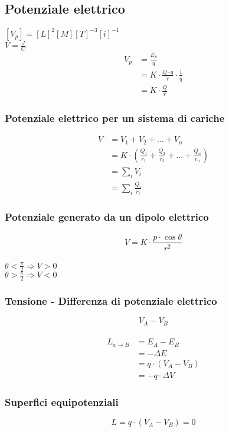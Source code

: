\documentclass[a4paper,12pt]{article}
\theoremstyle{mystyle}
\begin{document}
\newpage


\subsection{Potenziale elettrico}
\([V_p]=[L]^2[M][T]^{-3}[i]^{-1}\)\\
\(V= \frac{J}{C}\)\\
\[\begin{aligned}
    V_p &= \frac{E_p}{q} \\
    &= K \cdot \frac{Q \cdot q}{r} \cdot \frac{1}{q}\\
    &= K \cdot \frac{Q}{r}
\end{aligned}\]
\subsubsection{Potenziale elettrico per un sistema di cariche}
\[
\begin{aligned}
    V & = V_1 + V_2 + \ldots + V_n\\
    &= K \cdot \left( \frac{Q_1}{r_1} + \frac{Q_2}{r_2} + \ldots + \frac{Q_n}{r_n}\right ) \\
    &= \sum_i V_i\\
    &= \sum_i \frac{Q_i}{r_i}
\end{aligned}\]
\subsubsection{Potenziale generato da un dipolo elettrico}
\[V = K \cdot \frac{p \cdot \cos \theta}{r^2}\]\\
\(\theta < \frac{\pi}{2} \Rightarrow V >0\)\\
\(\theta > \frac{\pi}{2} \Rightarrow V < 0\)
\subsubsection{Tensione - Differenza di potenziale elettrico}
\[V_A - V_B\]\\
\[
\begin{aligned}
    L_{a \rightarrow B}& = E_A - E_B \\
    &= - \Delta E \\
    &= q \cdot (V_A - V_B)\\
    &= -q \cdot \Delta V
\end{aligned}\]
\subsubsection{Superfici equipotenziali}
\[L = q \cdot (V_A - V_B) = 0\]
\end{document}
